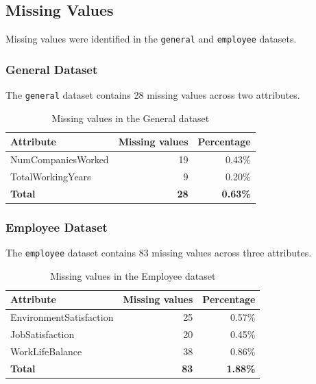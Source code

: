 \documentclass[12pt,a4paper]{article}
\begin{document}
\subsection{Missing Values}

Missing values were identified in the \texttt{general} and
\texttt{employee} datasets.

\subsubsection{General Dataset}

The \texttt{general} dataset contains 28 missing values
across two attributes.

\begin{table}[H]
\centering
\caption{Missing values in the General dataset}
\label{tab:general-missing}
\begin{tabular}{lrr}
\toprule
\textbf{Attribute} & \textbf{Missing values}
& \textbf{Percentage}\\
\midrule
NumCompaniesWorked & 19 & 0.43\%\\
TotalWorkingYears & 9 & 0.20\%\\
\midrule
\textbf{Total} & \textbf{28} & \textbf{0.63\%}\\
\bottomrule
\end{tabular}
\end{table}

\subsubsection{Employee Dataset}

The \texttt{employee} dataset contains 83 missing values
across three attributes.

\begin{table}[H]
\centering
\caption{Missing values in the Employee dataset}
\label{tab:employee-missing}
\begin{tabular}{lrr}
\toprule
\textbf{Attribute} & \textbf{Missing values}
& \textbf{Percentage}\\
\midrule
EnvironmentSatisfaction & 25 & 0.57\%\\
JobSatisfaction & 20 & 0.45\%\\
WorkLifeBalance & 38 & 0.86\%\\
\midrule
\textbf{Total} & \textbf{83} & \textbf{1.88\%}\\
\bottomrule
\end{tabular}
\end{table}
\end{document}
